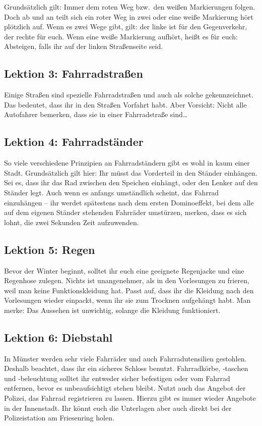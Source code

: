 \begin{multicols}{2}
Grundsätzlich gilt: Immer dem roten Weg bzw.\ den weißen Markierungen folgen.
Doch ab und an teilt sich ein roter Weg in zwei oder eine weiße Markierung hört plötzlich auf.
Wenn es zwei Wege gibt, gilt: der linke ist für den Gegenverkehr, der rechte für euch.
Wenn eine weiße Markierung aufhört, heißt es für euch: Absteigen, falls ihr auf der linken Straßenseite seid.

\subsection{Lektion 3: Fahrradstraßen}
Einige Straßen sind spezielle Fahrradstraßen und auch als solche gekennzeichnet.
Das bedeutet, dass ihr in den Straßen Vorfahrt habt.
Aber Vorsicht: Nicht alle Autofahrer bemerken, dass sie in einer Fahrradstraße sind\dots

\subsection{Lektion 4: Fahrradständer}
So viele verschiedene Prinzipien an Fahrradständern gibt es wohl in kaum einer Stadt.
Grundsätzlich gilt hier: Ihr müsst das Vorderteil in den Ständer einhängen.
Sei es, dass ihr das Rad zwischen den Speichen einhängt, oder den Lenker auf den Ständer legt.
Auch wenn es anfangs umständlich scheint, das Fahrrad einzuhängen -- ihr werdet spätestens nach dem ersten Dominoeffekt, bei dem alle auf dem eigenen Ständer stehenden Fahrräder umstürzen, merken, dass es sich lohnt, die zwei Sekunden Zeit aufzuwenden.

\subsection{Lektion 5: Regen}
Bevor der Winter beginnt, solltet ihr euch eine geeignete Regenjacke und eine Regenhose zulegen.
Nichts ist unangenehmer, als in den Vorlesungen zu frieren, weil man keine Funktionskleidung hat.
Passt auf, dass ihr die Kleidung nach den Vorlesungen wieder einpackt, wenn ihr sie zum Trocknen aufgehängt habt.
Man merke: Das Aussehen ist unwichtig, solange die Kleidung funktioniert.

\subsection{Lektion 6: Diebstahl}
In Münster werden sehr viele Fahrräder und auch Fahrradutensilien gestohlen.
Deshalb beachtet, dass ihr ein sicheres Schloss benutzt.
Fahrradkörbe, -taschen und -beleuchtung solltet ihr entweder sicher befestigen oder vom Fahrrad entfernen, bevor es unbeaufsichtigt stehen bleibt.
Nutzt auch das Angebot der Polizei, das Fahrrad registrieren zu lassen.
Hierzu gibt es immer wieder Angebote in der Innenstadt.
Ihr könnt euch die Unterlagen aber auch direkt bei der Polizeistation am Friesenring holen.


\end{multicols}
